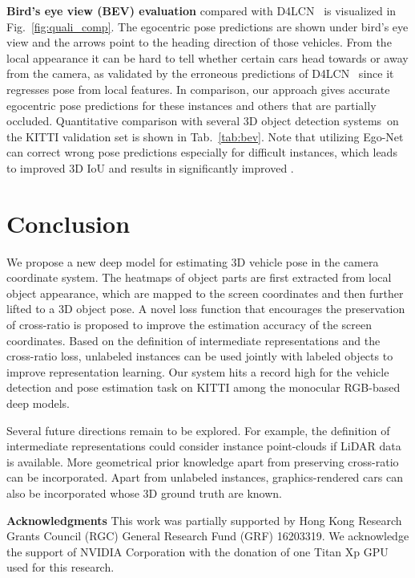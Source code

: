 \documentclass[final]{cvpr}
\begin{document}
\noindent \textbf{Bird's eye view (BEV) evaluation} compared with D4LCN~\cite{Ding_2020_CVPR} is visualized in Fig.~\ref{fig:quali_comp}. The egocentric pose predictions are shown under bird's eye view and the arrows point to the heading direction of those vehicles. From the local appearance it can be hard to tell whether certain cars head towards or away from the camera, as validated by the erroneous predictions of D4LCN~\cite{Ding_2020_CVPR} since it regresses pose from local features. In comparison, our approach gives accurate egocentric pose predictions for these instances and others that are partially occluded. Quantitative comparison with several 3D object detection systems~on the KITTI validation set is shown in Tab.~\ref{tab:bev}. Note that utilizing Ego-Net can correct wrong pose predictions especially for difficult instances, which leads to improved 3D IoU and results in significantly improved .
	
\section{Conclusion} 
We propose a new deep model for estimating 3D vehicle pose in the camera coordinate system. The heatmaps of object parts are first extracted from local object appearance, which are mapped to the screen coordinates and then further lifted to a 3D object pose. A novel loss function that encourages the preservation of cross-ratio is proposed to improve the estimation accuracy of the screen coordinates. Based on the definition of intermediate representations and the cross-ratio loss, unlabeled instances can be used jointly with labeled objects to improve representation learning. Our system hits a record high for the vehicle detection and pose estimation task on KITTI among the monocular RGB-based deep models. 

Several future directions remain to be explored. For example, the definition of intermediate representations could consider instance point-clouds if LiDAR data is available. More geometrical prior knowledge apart from preserving cross-ratio can be incorporated. Apart from unlabeled instances, graphics-rendered cars can also be incorporated whose 3D ground truth are known.

\noindent \textbf{Acknowledgments} This work was partially supported by Hong Kong Research Grants Council (RGC) General Research Fund (GRF) 16203319. We acknowledge the support
of NVIDIA Corporation with the donation of one Titan Xp GPU used for this research.
\end{document}
